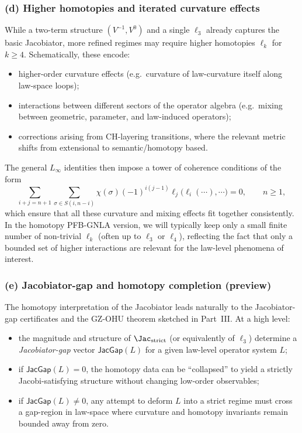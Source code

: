 \documentclass[11pt]{book}
\theoremstyle{plain}
\theoremstyle{definition}
\begin{document}
\subsubsection*{(d) Higher homotopies and iterated curvature effects}

While a two-term structure $(V^{-1},V^0)$ and a single $\ell_3$ already
captures the basic Jacobiator, more refined regimes may require higher
homotopies $\ell_k$ for $k\ge4$. Schematically, these encode:
\begin{itemize}
  \item higher-order curvature effects (e.g.\ curvature of law-curvature
        itself along law-space loops);
  \item interactions between different sectors of the operator algebra
        (e.g.\ mixing between geometric, parameter, and law-induced
        operators);
  \item corrections arising from CH-layering transitions, where the
        relevant metric shifts from extensional to semantic/homotopy
        based.
\end{itemize}

The general $L_\infty$ identities then impose a tower of coherence
conditions of the form
\[
   \sum_{i+j=n+1}
   \sum_{\sigma\in S(i,n-i)}
   \chi(\sigma)(-1)^{i(j-1)}
   \ell_j\bigl(\ell_i(\cdots),\cdots\bigr)
   = 0,
   \qquad n\ge1,
\]
which ensure that all these curvature and mixing effects fit together
consistently. In the homotopy PFB-GNLA version, we will typically keep
only a small finite number of non-trivial $\ell_k$ (often up to
$\ell_3$ or $\ell_4$), reflecting the fact that only a bounded set of
higher interactions are relevant for the law-level phenomena of
interest.



\subsubsection*{(e) Jacobiator-gap and homotopy completion (preview)}

The homotopy interpretation of the Jacobiator leads naturally to the
Jacobiator-gap certificates and the GZ-OHU theorem sketched in Part~III.
At a high level:

\begin{itemize}
  \item the magnitude and structure of $\Jac_{\mathrm{strict}}$ (or
        equivalently of $\ell_3$) determine a \emph{Jacobiator-gap}
        vector $\mathsf{JacGap}(L)$ for a given law-level operator
        system $L$;
  \item if $\mathsf{JacGap}(L)=0$, the homotopy data can be “collapsed”
        to yield a strictly Jacobi-satisfying structure without changing
        low-order observables;
  \item if $\mathsf{JacGap}(L)\neq0$, any attempt to deform $L$ into a
        strict regime must cross a gap-region in law-space where
        curvature and homotopy invariants remain bounded away from zero.
\end{itemize}
\end{document}
